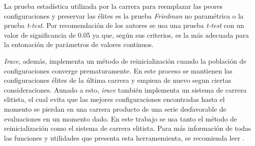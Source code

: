 
La prueba estadística utilizada por la carrera para reemplazar las peores configuraciones y preservar las élites es la prueba \emph{Friedman} no paramétrica o la prueba \emph{t-test}. Por recomendación de los autores se usa una prueba \emph{t-test} con un valor de significancia de 0.05 ya que, según sus criterios, es la más adecuada para la entonación de parámetros de valores continuos.

\emph{Irace}, además, implementa un método de reinicialización cuando la población de configuraciones converge prematuramente. En este proceso se mantienen las configuraciones élites de la última carrera y empieza de nuevo segun ciertas consideraciones. Aunado a esto, \emph{irace} también implementa un sistema de carrera elitista, el cual evita que las mejores configuraciones encontradas hasta el momento se pierdan en una carrera producto de una serie desfavorable de evaluaciones en un momento dado. En este trabajo se usa tanto el método de reinicialización como el sistema de carrera elitista. Para más información de todas las funciones y utilidades que presenta esta herramemienta, se recomienda leer \cite{lopez2016irace}.

